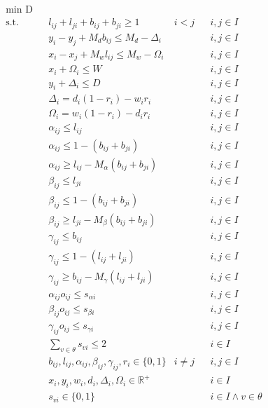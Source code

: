 \begin{align}
	& \underset{}{\text{min D}}\\
	& \text{s.t.} & &  l_{ij} + l_{ji} + b_{ij} + b_{ji} \geq 1 & i < j && i,j \in I \label{equa30}\\
	& & & y_i - y_j + M_d b_{ij} \leq M_d - \Delta_i & & & i,j \in I \label{equa31}\\
	& & & x_i - x_j + M_w l_{ij} \leq M_w - \Omega_i & & & i,j \in I \label{equa32}\\
	& & & x_i + \Omega_i \leq W & & & i,j \in I \label{equa33}\\
	& & & y_i + \Delta_i \leq D & & & i,j \in I \label{equa34}\\
	& & & \Delta_i = d_i (1 - r_i) - w_i r_i &      &   & i,j \in I \label{equa35}\\
	& & & \Omega_i = w_i (1 - r_i) - d_i r_i &      &   & i,j \in I \label{equa36}\\
	&   &   & \alpha_{ij} \leq l_{ij}                             &   &   & i,j \in I \label{equa37} \\
	&   &   & \alpha_{ij} \leq 1 - (b_{ij} + b_{ji})              &   &   & i,j \in I \label{equa38} \\
	&   &   & \alpha_{ij} \geq l_{ij} - M_\alpha(b_{ij} + b_{ji}) &   &   & i,j \in I \label{equa39} \\
	&   &   & \beta_{ij} \leq l_{ji}                              &   &   & i,j \in I \label{equa40} \\
	&   &   & \beta_{ij} \leq 1 - (b_{ij} + b_{ji})               &   &   & i,j \in I \label{equa41} \\
	&   &   & \beta_{ij} \geq l_{ji} - M_\beta(b_{ij} + b_{ji})   &   &   & i,j \in I \label{equa42} \\
	&   &   & \gamma_{ij} \leq b_{ij}                             &   &   & i,j \in I \label{equa43} \\
	&   &   & \gamma_{ij} \leq 1 - (l_{ij} + l_{ji})              &   &   & i,j \in I \label{equa44} \\
	&   &   & \gamma_{ij} \geq b_{ij} - M_\gamma(l_{ij} + l_{ji}) &   &   & i,j \in I \label{equa45} \\
	& & & \alpha_{ij}o_{ij} \leq s_{\alpha i}  & & & i,j \in I \label{equa46}\\
	& & & \beta_{ij}o_{ij} \leq s_{\beta i}  & & & i,j \in I \label{equa47}\\
	& & & \gamma_{ij}o_{ij} \leq s_{\gamma i}  & & & i,j \in I \label{equa48}\\
	  &   &   & \sum_{v \in \theta} s_{vi} \leq 2                                     &          &   & i \in I   &   & \label{equa49} \\
	  &   &   & b_{ij}, l_{ij}, \alpha_{ij}, \beta_{ij}, \gamma_{ij}, r_i \in \{0,1\} & i \neq j &   & i,j \in I &   & \label{equa50} \\
	&             &   & x_{i}, y_{i}, w_{i}, d_{i}, \Delta_{i}, \Omega_{i} \in \mathbb{R}^{+} &          &   & i \in I  \label{equa51}\\
	&   &   & s_{vi} \in \{0,1\} &   &   & i \in I \land v\in \theta \label{equa52} 
\end{align}

